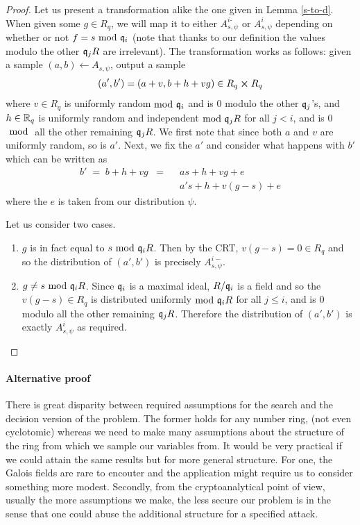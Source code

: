 \begin{proof}
  Let us present a transformation alike the one given in Lemma \ref{s-to-d}. When given some $g \in R_q$, we will map it to either $A^{i\text{-}}_{s, \psi}$ or $A^i_{s, \psi}$ depending on whether or not $f = s \mod \q_i$ (note that thanks to our definition the values modulo the other $\q_jR$ are irrelevant). The transformation works as follows: given a sample $(a, b) \leftarrow A_{s, \psi}$, output a sample
  \[ (a', b') = (a +v, b+h+vg) \in R_q \cross R_q \]
  where $v \in R_q$ is uniformly random$\mod \q_i$ and is 0 modulo the other $\q_j$'s, and $h \in \R_q$ is uniformly random and independent$\mod \q_j R$ for all $j < i$, and is 0$\mod$ all the other remaining $\q_j R$. We first note that since both $a$ and $v$ are uniformly random, so is $a'$. Next, we fix the $a'$ and consider what happens with $b'$ which can be written as
  \[ \begin{split}b' \; = \; b + h+vg \; \; = & \; \; as +h +vg +e \\
    & \; \; a's +h +v(g-s) +e
  \end{split}\]
  where the $e$ is taken from our distribution $\psi$.

  Let us consider two cases.
  \begin{enumerate}
    \item $g$ is in fact equal to $s \mod \q_i R$. Then by the CRT, $v(g-s) = 0 \in R_q$ and so the distribution of $(a', b')$ is precisely $A^{i-}_{s, \psi}$.
    \item $g \neq s \mod \q_i R$. Since $\q_i$ is a maximal ideal, $R/\q_i$ is a field and so the $v(g-s) \in R_q$ is distributed uniformly$\mod \q_i R$ for all $j \leq i$, and is 0 modulo all the other remaining $\q_j R$. Therefore the distribution of $(a', b')$ is exactly $A^i_{s, \psi}$ as required.
  \end{enumerate}
\end{proof}

\paragraph{Alternative proof}
There is great disparity between required assumptions for the search and the decision version of the problem. The former holds for any number ring, (not even cyclotomic) whereas we need to make many assumptions about the structure of the ring from which we sample our variables from. It would be very practical if we could attain the same results but for more general structure. For one, the Galois fields are rare to encouter and the application might require us to consider something more modest. Secondly, from the cryptoanalytical point of view, usually the more assumptions we make, the less secure our problem is in the sense that one could abuse the additional structure for a specified attack.

